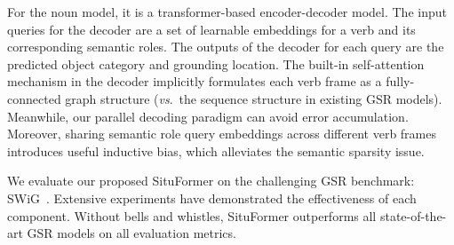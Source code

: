 \documentclass[letterpaper]{article} %
\newcommand{\vs}{\textit{vs}.}
\begin{document}
For the noun model, it is a transformer-based encoder-decoder model. The input queries for the decoder are a set of learnable embeddings for a verb and its corresponding semantic roles. The outputs of the decoder for each query are the predicted object category and grounding location. The built-in self-attention mechanism in the decoder implicitly formulates each verb frame as a fully-connected graph structure (\vs~the sequence structure in existing GSR models). Meanwhile, our parallel decoding paradigm can avoid error accumulation. Moreover, sharing semantic role query embeddings across different verb frames introduces useful inductive bias, which alleviates the semantic sparsity issue.


We evaluate our proposed SituFormer on the challenging GSR benchmark: SWiG~\cite{pratt2020grounded}. Extensive experiments have demonstrated the effectiveness of each component. Without bells and whistles, SituFormer outperforms all state-of-the-art GSR models on all evaluation metrics.



\end{document}
